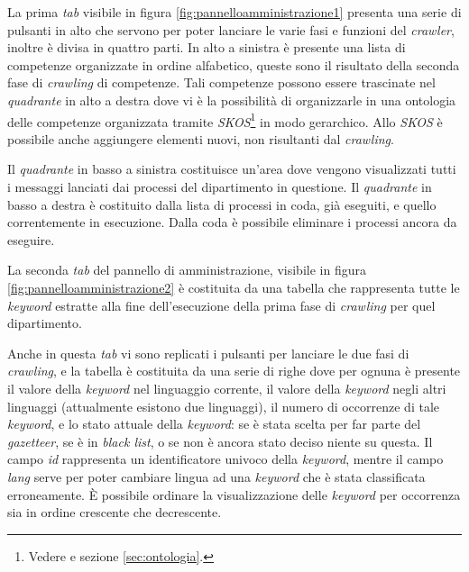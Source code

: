 \documentclass[tesi.tex]{subfiles}
\begin{document}
La prima \emph{tab} visibile in figura \ref{fig:pannelloamministrazione1}
presenta una serie di pulsanti in alto che servono per poter lanciare
le varie fasi e funzioni del \emph{crawler}, inoltre \`e divisa in
quattro parti. In alto a sinistra \`e presente una lista di competenze
organizzate in ordine alfabetico, queste sono il risultato della
seconda fase di \emph{crawling} di competenze. Tali competenze possono
essere trascinate nel \emph{quadrante} in alto a destra dove vi \`e la
possibilit\`a di organizzarle in una ontologia delle competenze
organizzata tramite \emph{SKOS}\footnote{Vedere
  \cite{skos} e sezione \ref{sec:ontologia}.} in modo gerarchico. Allo \emph{SKOS} \`e possibile anche
aggiungere elementi nuovi, non risultanti dal \emph{crawling}.

Il \emph{quadrante} in basso a sinistra costituisce un'area dove vengono visualizzati tutti i messaggi
lanciati dai processi del dipartimento in questione. Il
\emph{quadrante} in basso a destra \`e
costituito dalla lista di processi in coda, gi\`a eseguiti, e quello
correntemente in esecuzione. Dalla coda \`e possibile
eliminare i processi ancora da eseguire.

La seconda \emph{tab} del pannello di amministrazione, visibile in
figura \ref{fig:pannelloamministrazione2}
\`e costituita da una tabella che rappresenta tutte le \emph{keyword}
estratte alla fine dell'esecuzione della prima fase di \emph{crawling}
per quel dipartimento.

Anche in questa \emph{tab} vi sono replicati i pulsanti per lanciare
le due fasi di \emph{crawling}, e la tabella \`e costituita da una
serie di righe dove per ognuna \`e presente il valore della
\emph{keyword} nel linguaggio corrente, il valore della \emph{keyword}
negli altri linguaggi (attualmente esistono due linguaggi), il numero di occorrenze
di tale \emph{keyword}, e lo stato attuale della \emph{keyword}: se
\`e stata scelta per far parte del \emph{gazetteer}, se
\`e in
\emph{black list}, o se non \`e ancora stato deciso niente su
questa. Il campo \emph{id} rappresenta un identificatore univoco della
\emph{keyword}, mentre il campo \emph{lang}
serve per poter cambiare lingua ad una \emph{keyword} che \`e stata
classificata erroneamente. \`E possibile ordinare la visualizzazione
delle \emph{keyword} per occorrenza sia in ordine crescente che
decrescente.
\end{document}
